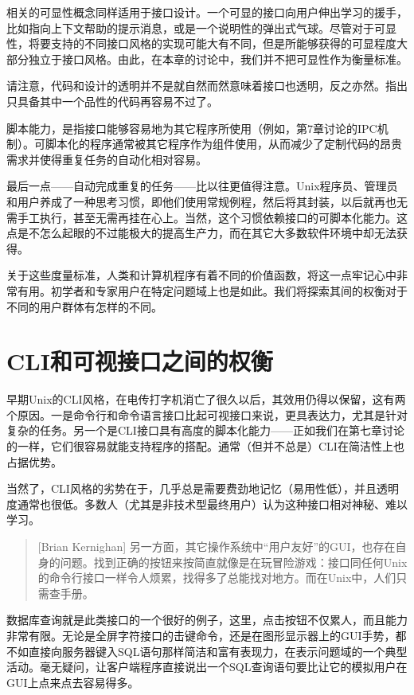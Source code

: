 \documentclass[12pt,oneside]{book}
\begin{document}
\begin{common-format}
相关的可显性概念同样适用于接口设计。一个可显的接口向用户伸出学习的援手，比如指向上下文帮助的提示消息，或是一个说明性的弹出式气球。尽管对于可显性，将要支持的不同接口风格的实现可能大有不同，但是所能够获得的可显程度大部分独立于接口风格。由此，在本章的讨论中，我们并不把可显性作为衡量标准。

请注意，代码和设计的透明并不是就自然而然意味着接口也透明，反之亦然。指出只具备其中一个品性的代码再容易不过了。

脚本能力，是指接口能够容易地为其它程序所使用（例如，第7章讨论的IPC机制）。可脚本化的程序通常被其它程序作为组件使用，从而减少了定制代码的昂贵需求并使得重复任务的自动化相对容易。

最后一点——自动完成重复的任务——比以往更值得注意。Unix程序员、管理员和用户养成了一种思考习惯，即他们使用常规例程，然后将其封装，以后就再也无需手工执行，甚至无需再挂在心上。当然，这个习惯依赖接口的可脚本化能力。这点是不怎么起眼的不过能极大的提高生产力，而在其它大多数软件环境中却无法获得。

关于这些度量标准，人类和计算机程序有着不同的价值函数，将这一点牢记心中非常有用。初学者和专家用户在特定问题域上也是如此。我们将探索其间的权衡对于不同的用户群体有怎样的不同。

\section{CLI和可视接口之间的权衡}
早期Unix的CLI风格，在电传打字机消亡了很久以后，其效用仍得以保留，这有两个原因。一是命令行和命令语言接口比起可视接口来说，更具表达力，尤其是针对复杂的任务。另一个是CLI接口具有高度的脚本化能力——正如我们在第七章讨论的一样，它们很容易就能支持程序的搭配。通常（但并不总是）CLI在简洁性上也占据优势。

当然了，CLI风格的劣势在于，几乎总是需要费劲地记忆（易用性低），并且透明度通常也很低。多数人（尤其是非技术型最终用户）认为这种接口相对神秘、难以学习。

\begin{quote}[Brian Kernighan]
另一方面，其它操作系统中“用户友好”的GUI，也存在自身的问题。找到正确的按钮来按简直就像是在玩冒险游戏：接口同任何Unix的命令行接口一样令人烦累，找得多了总能找对地方。而在Unix中，人们只需查手册。
\end{quote}

数据库查询就是此类接口的一个很好的例子，这里，点击按钮不仅累人，而且能力非常有限。无论是全屏字符接口的击键命令，还是在图形显示器上的GUI手势，都不如直接向服务器键入SQL语句那样简洁和富有表现力，在表示问题域的一个典型活动。毫无疑问，让客户端程序直接说出一个SQL查询语句要比让它的模拟用户在GUI上点来点去容易得多。


\end{common-format}
\end{document}
